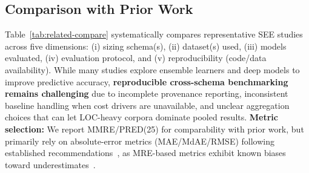 \documentclass{ieeeaccess}
\begin{document}
\subsection{Comparison with Prior Work}

Table~\ref{tab:related-compare} systematically compares representative SEE studies across five dimensions: (i) sizing schema(s), (ii) dataset(s) used, (iii) models evaluated, (iv) evaluation protocol, and (v) reproducibility (code/data availability). While many studies explore ensemble learners and deep models to improve predictive accuracy, \textbf{reproducible cross-schema benchmarking remains challenging} due to incomplete provenance reporting, inconsistent baseline handling when cost drivers are unavailable, and unclear aggregation choices that can let LOC-heavy corpora dominate pooled results. \textbf{Metric selection:} We report MMRE/PRED(25) for comparability with prior work, but primarily rely on absolute-error metrics (MAE/MdAE/RMSE) following established recommendations~\cite{shepperd2012evaluating,kitchenham2001evaluating}, as MRE-based metrics exhibit known biases toward underestimates~\cite{foss2003bias}. 
\end{document}
